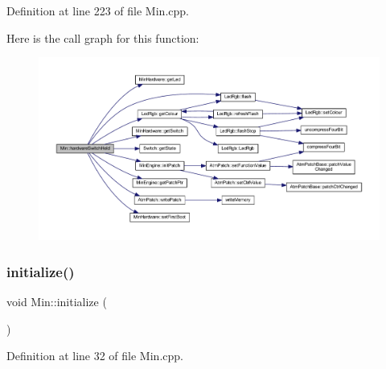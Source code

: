 Definition at line 223 of file Min.\+cpp.

Here is the call graph for this function\+:
\nopagebreak
\begin{figure}[H]
\begin{center}
\leavevmode
\includegraphics[width=350pt]{dd/d34/class_min_aa17c2510883d894f135d6a0582cc8bea_cgraph}
\end{center}
\end{figure}
\mbox{\label{class_min_a0fbb740ee813f44c6b0082d9a980875c}} 
\subsubsection{\texorpdfstring{initialize()}{initialize()}}
{\footnotesize\ttfamily void Min\+::initialize (\begin{DoxyParamCaption}{ }\end{DoxyParamCaption})}



Definition at line 32 of file Min.\+cpp.

